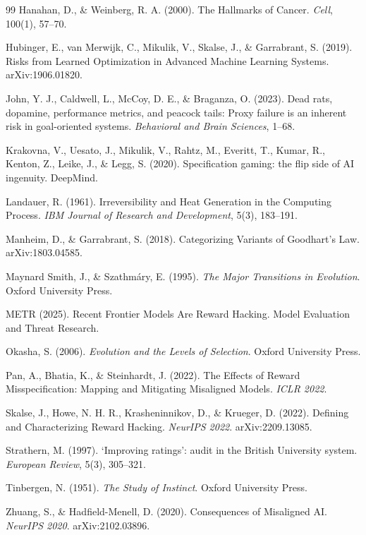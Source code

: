 \documentclass[11pt]{article}
\begin{document}
\begin{thebibliography}{99}
 Hanahan, D., \& Weinberg, R. A. (2000). The Hallmarks of Cancer. \emph{Cell}, 100(1), 57--70.

 Hubinger, E., van Merwijk, C., Mikulik, V., Skalse, J., \& Garrabrant, S. (2019). Risks from Learned Optimization in Advanced Machine Learning Systems. arXiv:1906.01820.

 John, Y. J., Caldwell, L., McCoy, D. E., \& Braganza, O. (2023). Dead rats, dopamine, performance metrics, and peacock tails: Proxy failure is an inherent risk in goal-oriented systems. \emph{Behavioral and Brain Sciences}, 1--68.

 Krakovna, V., Uesato, J., Mikulik, V., Rahtz, M., Everitt, T., Kumar, R., Kenton, Z., Leike, J., \& Legg, S. (2020). Specification gaming: the flip side of AI ingenuity. DeepMind.

 Landauer, R. (1961). Irreversibility and Heat Generation in the Computing Process. \emph{IBM Journal of Research and Development}, 5(3), 183--191.

 Manheim, D., \& Garrabrant, S. (2018). Categorizing Variants of Goodhart's Law. arXiv:1803.04585.

 Maynard Smith, J., \& Szathm\'ary, E. (1995). \emph{The Major Transitions in Evolution}. Oxford University Press.

 METR (2025). Recent Frontier Models Are Reward Hacking. Model Evaluation and Threat Research.

 Okasha, S. (2006). \emph{Evolution and the Levels of Selection}. Oxford University Press.

 Pan, A., Bhatia, K., \& Steinhardt, J. (2022). The Effects of Reward Misspecification: Mapping and Mitigating Misaligned Models. \emph{ICLR 2022}.

 Skalse, J., Howe, N. H. R., Krasheninnikov, D., \& Krueger, D. (2022). Defining and Characterizing Reward Hacking. \emph{NeurIPS 2022}. arXiv:2209.13085.

 Strathern, M. (1997). `Improving ratings': audit in the British University system. \emph{European Review}, 5(3), 305--321.

 Tinbergen, N. (1951). \emph{The Study of Instinct}. Oxford University Press.

 Zhuang, S., \& Hadfield-Menell, D. (2020). Consequences of Misaligned AI. \emph{NeurIPS 2020}. arXiv:2102.03896.

\end{thebibliography}
\end{document}
